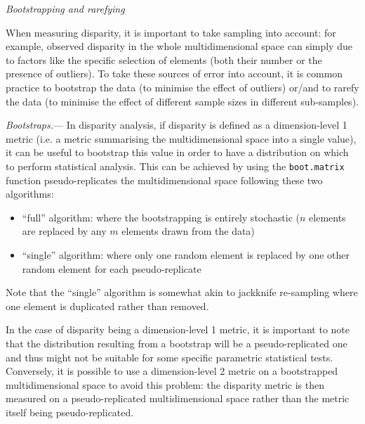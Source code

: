 \documentclass[12pt,letterpaper]{article}
\renewcommand{\subsection}[1]{%
\bigskip
\begin{center}
\begin{large}
\normalfont\itshape #1
\end{large}
\end{center}}
\renewcommand{\subsubsection}[1]{%
\vspace{2ex}
\noindent
\textit{#1.}---}
\begin{document}
\subsection{Bootstrapping and rarefying}
When measuring disparity, it is important to take sampling into account: for example, observed disparity in the whole multidimensional space can simply due to factors like the specific selection of elements (both their number or the presence of outliers).
To take these sources of error into account, it is common practice to bootstrap the data (to minimise the effect of outliers) or/and to rarefy the data (to minimise the effect of different sample sizes in different sub-samples).

\subsubsection{Bootstraps}
In disparity analysis, if disparity is defined as a dimension-level 1 metric (i.e. a metric summarising the multidimensional space into a single value), it can be useful to bootstrap this value in order to have a distribution on which to perform statistical analysis.
This can be achieved by using the \texttt{boot.matrix} function pseudo-replicates the multidimensional space following these two algorithms:

\begin{itemize}
    \item ``full'' algorithm: where the bootstrapping is entirely stochastic ($n$ elements are replaced by any $m$ elements drawn from the data)
    \item ``single'' algorithm: where only one random element is replaced by one other random element for each pseudo-replicate
\end{itemize}

\noindent Note that the ``single'' algorithm is somewhat akin to jackknife re-sampling where one element is duplicated rather than removed.

In the case of disparity being a dimension-level 1 metric, it is important to note that the distribution resulting from a bootstrap will be a pseudo-replicated one and thus might not be suitable for some specific parametric statistical tests.
Conversely, it is possible to use a dimension-level 2 metric on a bootstrapped multidimensional space to avoid this problem: the disparity metric is then measured on a pseudo-replicated multidimensional space rather than the metric itself being pseudo-replicated.
\end{document}
